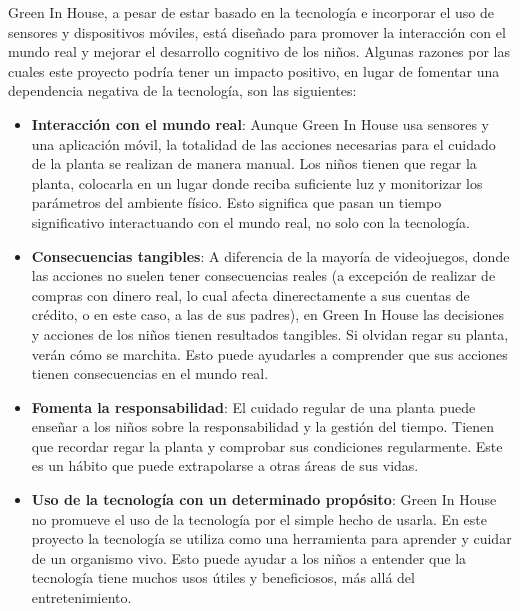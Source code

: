 Green In House, a pesar de estar basado en la tecnología e incorporar el uso de sensores y dispositivos móviles, está diseñado para promover la interacción con el mundo real y mejorar el desarrollo cognitivo de los niños. Algunas razones por las cuales este proyecto podría tener un impacto positivo, en lugar de fomentar una dependencia negativa de la tecnología, son las siguientes:
\begin{itemize}
    \item \textbf{Interacción con el mundo real}: Aunque Green In House usa sensores y una aplicación móvil, la totalidad de las acciones necesarias para el cuidado de la planta se realizan de manera manual. Los niños tienen que regar la planta, colocarla en un lugar donde reciba suficiente luz y monitorizar los parámetros del ambiente físico. Esto significa que pasan un tiempo significativo interactuando con el mundo real, no solo con la tecnología.
    \item \textbf{Consecuencias tangibles}: A diferencia de la mayoría de videojuegos, donde las acciones no suelen tener consecuencias reales (a excepción de realizar de compras con dinero real, lo cual afecta dinerectamente a sus cuentas de crédito, o en este caso, a las de sus padres), en Green In House las decisiones y acciones de los niños tienen resultados tangibles. Si olvidan regar su planta, verán cómo se marchita. Esto puede ayudarles a comprender que sus acciones tienen consecuencias en el mundo real. 
    \item \textbf{Fomenta la responsabilidad}: El cuidado regular de una planta puede enseñar a los niños sobre la responsabilidad y la gestión del tiempo. Tienen que recordar regar la planta y comprobar sus condiciones regularmente. Este es un hábito que puede extrapolarse a otras áreas de sus vidas.  
    \item \textbf{Uso de la tecnología con un determinado propósito}: Green In House no promueve el uso de la tecnología por el simple hecho de usarla. En este proyecto la tecnología se utiliza como una herramienta para aprender y cuidar de un organismo vivo. Esto puede ayudar a los niños a entender que la tecnología tiene muchos usos útiles y beneficiosos, más allá del entretenimiento.
\end{itemize}

